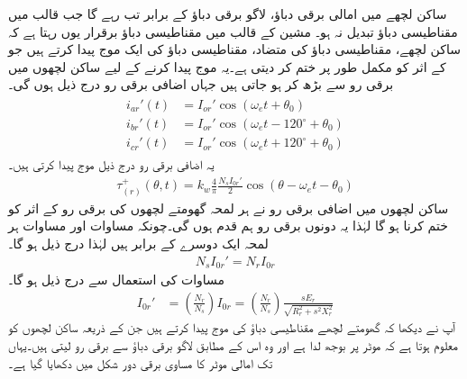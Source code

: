 ساکن لچھے میں امالی برقی دباؤ،  لاگو برقی دباؤ کے برابر تب رہے گا جب قالب میں مقناطیسی دباؤ تبدیل نہ ہو۔ مشین کے قالب میں مقناطیسی دباؤ برقرار یوں رہتا ہے کہ ساکن لچھے،  مقناطیسی دباؤ   کی متضاد، مقناطیسی دباؤ کی ایک موج پیدا کرتے ہیں جو  کے اثر کو مکمل طور پر ختم کر دیتی ہے۔یہ موج پیدا کرنے کے لیے ساکن لچھوں میں برقی رو  سے بڑھ کر  ہو جاتی  ہیں جہاں اضافی  برقی رو درج ذیل ہوں  گی۔
\begin{gather}
\begin{aligned}\label{مساوات_امالی_تین_رو_الف}
i_{ar}'(t)&=I_{or}' \cos (\omega_e t+\theta_0)\\
i_{br}'(t)&=I_{or}' \cos (\omega_e t-120^{\circ}+\theta_0)\\
i_{cr}'(t)&=I_{or}' \cos (\omega_e t+120^{\circ}+\theta_0)
\end{aligned}
\end{gather}
یہ اضافی برقی رو درج ذیل موج پیدا کرتی  ہیں۔
\begin{align}\label{مساوات_امالی_اضافی_موج}
\tau_{(r)}^+(\theta,t)=k_w \frac{4}{\pi}\frac{N_s I_{0r}'}{2} \cos (\theta-\omega_e t -\theta_0)
\end{align}
ساکن لچھوں میں اضافی برقی رو نے ہر لمحہ گھومتے لچھوں کی  برقی رو کے اثر کو ختم کرنا ہو گا  لہٰذا یہ دونوں برقی رو ہم قدم  ہوں گی۔چونکہ  مساوات  اور مساوات  ہر لمحہ ایک دوسرے کے  برابر ہیں لہٰذا درج ذیل ہو گا۔
\begin{align}
N_s I_{0r}'=N_r I_{0r}
\end{align}
مساوات  کی استعمال سے  درج ذیل ہو گا۔
\begin{align}\label{مساوات_امالی_گھومتے_لچھے_کا_ساکن_پر_رو_اثر}
I_{0r}'&=\left(\frac{N_r}{N_s}\right) I_{0r}=\left(\frac{N_r}{N_s}\right) \frac{s E_r}{\sqrt{R_r^2+s^2 X_r^2}}
\end{align}
آپ نے دیکھا کہ گھومتے لچھے مقناطیسی دباؤ کی موج پیدا کرتے ہیں جن کے ذریعہ ساکن لچھوں کو معلوم ہوتا ہے کہ موٹر پر بوجھ لدا ہے اور وہ اس کے مطابق لاگو برقی دباؤ سے برقی رو لیتی ہیں۔یہاں تک امالی موٹر کا مساوی برقی دور شکل   میں دکھایا گیا ہے۔
